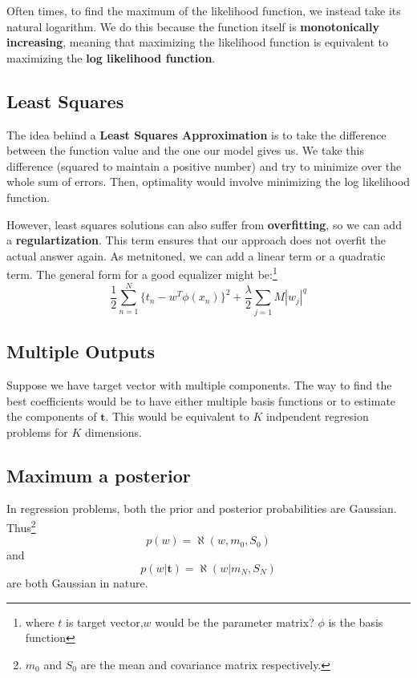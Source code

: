 \documentclass{tufte-handout}
\begin{document}
	Often times, to find the maximum of the likelihood function, we instead take its natural
	logarithm. We do this because the function itself is \textbf{monotonically increasing},
	meaning that maximizing the likelihood function is equivalent to maximizing the 
	\textbf{log likelihood function}.
	\subsection{Least Squares}
	The idea behind a \textbf{Least Squares Approximation} is to take the difference between the 
	function value and the one our model gives us. We take this difference (squared to maintain a
	positive number) and try to minimize over the whole sum of errors. Then, optimality would involve
	minimizing the log likelihood function.

	However, least squares solutions can also suffer from \textbf{overfitting}, so we can add
	a \textbf{regulartization}. This term ensures that our approach does not overfit the actual
	answer again. As metnitoned, we can add a linear term or a quadratic term. The general form 
	for a good equalizer might be:\footnote{where $t$ is target vector,$w$ would be the 
	parameter matrix? $\phi$ is the basis function}
	\[ \frac{1}{2}\sum_{n=1}^{N}\{t_{n}-w^{T}\phi(x_{n})\}^{2}+ \frac{\lambda}{2}\sum_{j=1}{M}|w_{j}|^{q} \]

	\subsection{Multiple Outputs}
	Suppose we have target vector with multiple components. The way to find the best coefficients would
	be to have either multiple basis functions or to estimate the components of $\textbf{t}$. This would
	be equivalent to $K$ indpendent regresion problems for $K$ dimensions.
	\subsection{Maximum a posterior}
	In regression problems, both the prior and posterior probabilities are Gaussian.
	Thus\footnote{$m_{0}$ and $S_{0}$ are the mean and covariance matrix respectively.} 
	\[ p(w) = \aleph(w,m_{0},S_{0})\]
	and 
	\[ p(w|\textbf{t}) = \aleph(w|m_{N},S_{N})\]
	are both Gaussian in nature.
	
\end{document}
